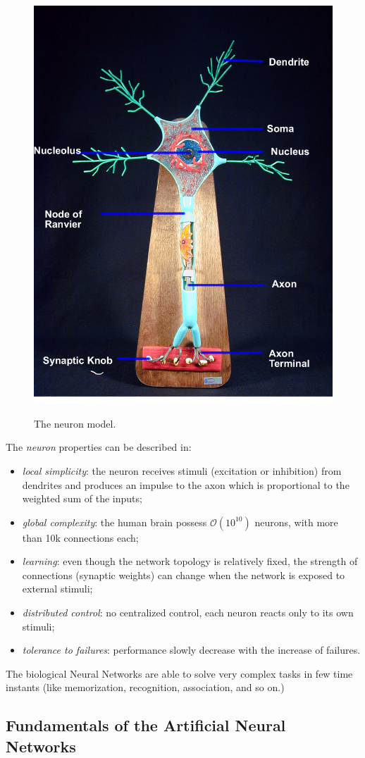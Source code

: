 \begin{figure}[t]
\centering
\caption[Neuron Model]{The neuron model.}
\includegraphics[width=0.5\linewidth]{img/neuron_model}
\label{fig:neuron}
\end{figure}

The \textit{neuron} properties can be described in:
\begin{itemize}
\item \textit{local simplicity}: the neuron receives stimuli (excitation or inhibition) from dendrites and produces an impulse to the axon which is proportional to the weighted sum of the inputs;
\item \textit{global complexity}: the human brain possess 
$\mathcal{O}(10^{10})$ 
neurons, with more than 10k connections each;
\item \textit{learning}: even though the network topology is relatively fixed, the strength of connections (synaptic weights) can change when the network is exposed to external stimuli;
\item \textit{distributed control}: no centralized control, each neuron reacts only to its own stimuli;
\item \textit{tolerance to failures}: performance slowly decrease with the increase of failures.
\end{itemize}

The biological Neural Networks are able to solve very complex tasks in few time instants (like memorization, recognition, association, and so on.)

\subsection{Fundamentals of the Artificial Neural Networks} 

